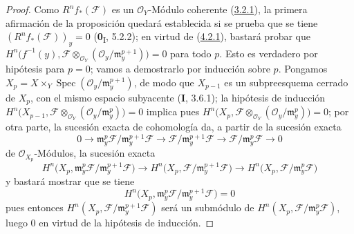 \begin{proof}
Como $R^nf_*(\mathcal F)$ es un $\mathcal O_Y$-Módulo coherente
(\hyperref[III.3.2.1-fr]{3.2.1}), la primera afirmación de la proposición
quedará establecida si se prueba que se tiene
$(R^nf_*(\mathcal F))_y=0$ (\textbf{0}\textsubscript{I}, 5.2.2); en virtud de
(\hyperref[III.4.2.1-fr]{4.2.1}), bastará probar que
$H^n\bigl(f^{-1}(y),\mathcal F\otimes_{\mathcal O_Y}
(\mathcal O_y/\mathfrak m_y^{p+1})\bigr)=0$
para todo $p$. Esto es verdadero por hipótesis para $p=0$; vamos a demostrarlo
por inducción sobre $p$. Pongamos
$X_p=X\times_Y\operatorname{Spec}
(\mathcal O_y/\mathfrak m_y^{p+1})$,
de modo que $X_{p-1}$ es un subpreesquema cerrado de $X_p$, con el mismo
espacio subyacente (\textbf{I}, 3.6.1); la hipótesis de inducción
$H^n\bigl(X_{p-1},\mathcal F\otimes_{\mathcal O_Y}
(\mathcal O_y/\mathfrak m_y^p)\bigr)=0$
implica pues
$H^n\bigl(X_p,\mathcal F\otimes_{\mathcal O_Y}
(\mathcal O_y/\mathfrak m_y^p)\bigr)=0$;
por otra parte, la sucesión exacta de cohomología da, a partir de la sucesión
exacta
\[
0\longrightarrow
\mathfrak m_y^p\mathcal F/\mathfrak m_y^{p+1}\mathcal F
\longrightarrow
\mathcal F/\mathfrak m_y^{p+1}\mathcal F
\longrightarrow
\mathcal F/\mathfrak m_y^p\mathcal F
\longrightarrow0
\]
de $\mathcal O_{X_p}$-Módulos, la sucesión exacta
\[
H^n\bigl(X_p,
\mathfrak m_y^p\mathcal F/\mathfrak m_y^{p+1}\mathcal F\bigr)
\longrightarrow
H^n\bigl(X_p,\mathcal F/\mathfrak m_y^{p+1}\mathcal F\bigr)
\longrightarrow
H^n\bigl(X_p,\mathcal F/\mathfrak m_y^p\mathcal F\bigr)
\]
y bastará mostrar que se tiene
\[
\label{III.4.6.1.1-fr}
H^n\bigl(X_p,
\mathfrak m_y^p\mathcal F/\mathfrak m_y^{p+1}\mathcal F\bigr)=0
\tag{4.6.1.1}
\]
pues entonces $H^n(X_p,\mathcal F/\mathfrak m_y^{p+1}\mathcal F)$ será un
submódulo de $H^n(X_p,\mathcal F/\mathfrak m_y^p\mathcal F)$, luego $0$ en
virtud de la hipótesis de inducción.


\end{proof}
